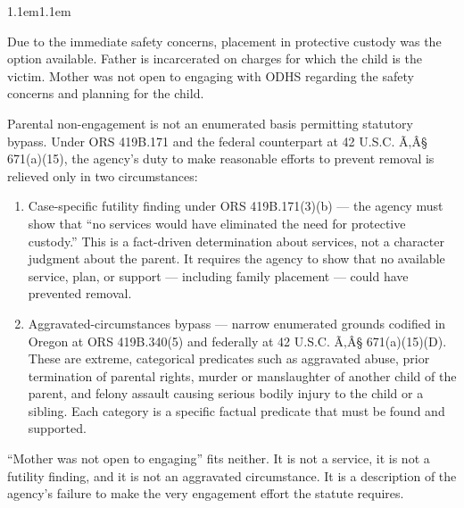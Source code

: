 \documentclass[10pt,a4paper,roman]{moderncv}
\renewenvironment{quote}{%
	\par\smallskip{\color{inkblue}\rule{\linewidth}{0.7pt}}\par\vspace{6pt}%
	\leftskip1.1em\rightskip1.1em\itshape\color{inkblue!92!black}%
}{%
	\par\vspace{6pt}{\color{inkblue}\rule{\linewidth}{0.7pt}}\par\smallskip%
}
\begin{document}
\begin{enumerate}[leftmargin=*,itemsep=0.35em,topsep=0.3em,resume]
\begin{center}
	\begin{minipage}{0.80\textwidth}
		\begin{quote}
			Due to the immediate safety concerns, placement in protective custody was the option available. Father is incarcerated on charges for which the child is the victim. Mother was not open to engaging with ODHS regarding the safety concerns and planning for the child.
		\end{quote}
	\end{minipage}
\end{center}

Parental non-engagement is not an enumerated basis permitting statutory bypass. Under ORS 419B.171 and the federal counterpart at 42 U.S.C. Ã‚Â§ 671(a)(15), the agency's duty to make reasonable efforts to prevent removal is relieved only in two circumstances:

\begin{enumerate}
	\item Case-specific futility finding under ORS 419B.171(3)(b) --- the agency must show that ``no services would have eliminated the need for protective custody.'' This is a fact-driven determination about services, not a character judgment about the parent. It requires the agency to show that no available service, plan, or support --- including family placement --- could have prevented removal.
	
	\item Aggravated-circumstances bypass --- narrow enumerated grounds codified in Oregon at ORS 419B.340(5) and federally at 42 U.S.C. Ã‚Â§ 671(a)(15)(D). These are extreme, categorical predicates such as aggravated abuse, prior termination of parental rights, murder or manslaughter of another child of the parent, and felony assault causing serious bodily injury to the child or a sibling. Each category is a specific factual predicate that must be found and supported.\\
\end{enumerate}

``Mother was not open to engaging'' fits neither. It is not a service, it is not a futility finding, and it is not an aggravated circumstance. It is a description of the agency's failure to make the very engagement effort the statute requires.\\


\end{enumerate}
\end{document}
